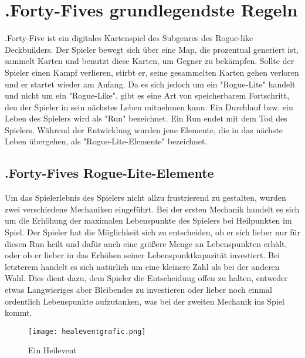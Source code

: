
\section{.Forty-Fives grundlegendste Regeln}\label{sec:grundlegenste-regeln}

\renewcommand{\kapitelautor}{Autor: Irgendwer} %

%
.Forty-Five ist ein digitales Kartenspiel des Subgenres des Rogue-like Deckbuilders. %
Der Spieler bewegt sich über eine Map, die prozentual generiert ist, sammelt Karten und benutzt diese Karten,
um Gegner zu bekämpfen. Sollte der Spieler einen Kampf verlieren, stirbt er, seine gesammelten Karten
gehen verloren und er startet wieder am Anfang. Da es sich jedoch um ein "Rogue-Lite" handelt und nicht um ein "Rogue-Like",
gibt es eine Art von speicherbarem Fortschritt, den der Spieler in sein nächstes Leben mitnehmen kann.
Ein Durchlauf bzw. ein Leben des Spielers wird als "Run" bezeichnet. Ein Run endet mit dem Tod des Spielers.
Während der Entwicklung wurden jene Elemente, die in das nächste Leben übergehen, als "Rogue-Lite-Elemente" bezeichnet.



\subsection{.Forty-Fives Rogue-Lite-Elemente}\label{rogue_lite_elemente}

Um das Spielerlebnis des Spielers nicht allzu frustrierend zu gestalten, wurden zwei verschiedene Mechaniken eingeführt.
Bei der ersten Mechanik handelt es sich um die Erhöhung der maximalen Lebenspunkte des Spielers bei Heilpunkten im Spiel. Der Spieler hat die Möglichkeit
sich zu entscheiden, ob er sich lieber nur für diesen Run heilt und dafür auch eine größere Menge an Lebenspunkten erhält, oder ob er
lieber in das Erhöhen seiner Lebenspunktkapazität investiert. Bei letzterem handelt es sich natürlich um eine kleinere Zahl als bei der anderen Wahl.
Dies dient dazu, dem Spieler die Entscheidung offen zu halten, entweder etwas Langwieriges aber Bleibendes zu investieren oder lieber noch einmal ordentlich
Lebenspunkte aufzutanken, was bei der zweiten Mechanik ins Spiel kommt. %

\begin{figure}[H]
\texttt{[image: healeventgrafic.png]}
\caption{Ein Heilevent}
\end{figure}



